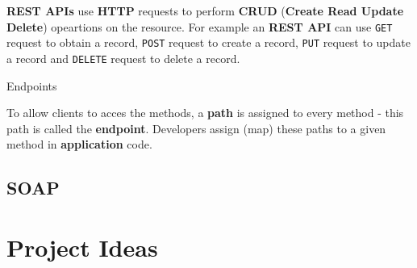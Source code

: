 \textbf{REST APIs} use \textbf{HTTP} requests to perform \textbf{CRUD} (\textbf{Create Read Update Delete}) opeartions on the resource. For example an \textbf{REST API} can use \texttt{GET} request to obtain a record, \texttt{POST} request to create a record, \texttt{PUT} request to update a record and \texttt{DELETE} request to delete a record.

Endpoints

To allow clients to acces the methods, a \textbf{path} is assigned to every method - this path is called the \textbf{endpoint}. Developers assign (map) these paths to a given method in \textbf{application} code.

\section{SOAP}

\chapter{Project Ideas}